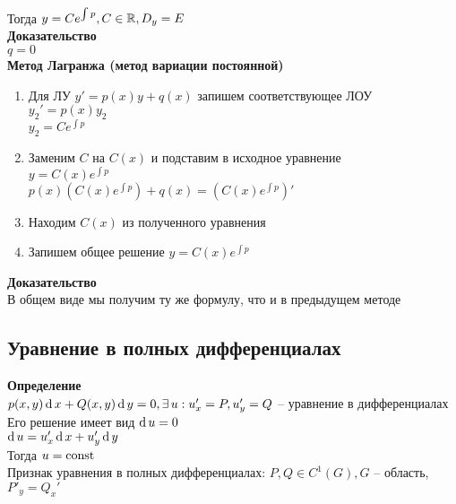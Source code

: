 \documentclass[12pt]{article}
\begin{document}
Тогда $y = Ce^{\int p}, C \in \mathbb{R}, D_y = E$\\
\textbf{Доказательство}\\
$q = 0$\\
\textbf{Метод Лагранжа (метод вариации постоянной)}
\begin{enumerate}
    \item Для ЛУ $y' = p(x)y + q(x)$ запишем соответствующее ЛОУ\\
    $y_2'=p(x)y_2$\\
    $y_2=Ce^{\int p}$
    \item Заменим $C$ на $C(x)$ и подставим в исходное уравнение\\
    $y = C(x)e^{\int p}$\\
    $p(x)(C(x)e^{\int p})+q(x) = (C(x)e^{\int p})'$
    \item Находим $C(x)$ из полученного уравнения
    \item Запишем общее решение $y=C(x)e^{\int p}$
\end{enumerate}
\textbf{Доказательство}\\
В общем виде мы получим ту же формулу, что и в предыдущем методе
\subsection{Уравнение в полных дифференциалах}
\textbf{Определение}\\
$p(x,y)\operatorname{d} x + Q(x,y)\operatorname{d} y = 0, \exists\, u: u_x'=P, u_y' = Q$ -- уравнение в дифференциалах\\
Его решение имеет вид $\operatorname{d} u = 0$\\
$\operatorname{d} u = u_x'\operatorname{d} x + u_y'\operatorname{d} y$\\
Тогда $u = \operatorname{const}$\\
Признак уравнения в полных дифференциалах: $P,Q \in C^1(G), G$ -- область, $P'_y = Q_x'$
\end{document}
